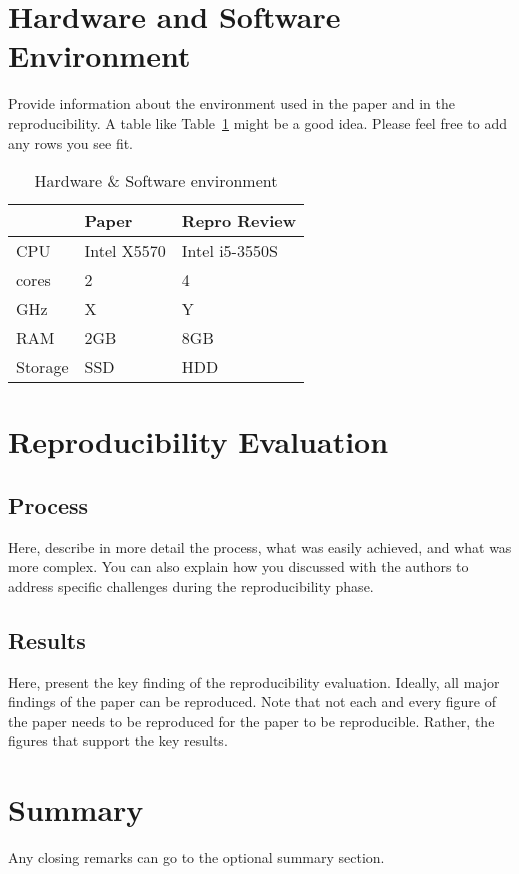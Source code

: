 \documentclass[sigconf]{acmart}
\begin{document}
\section{Hardware and Software Environment}
Provide information about the environment used in the paper and in the reproducibility. A table like Table~\ref{tab:environment} might be a good idea. Please feel free to add any rows you see fit.

\begin{table}[h]
  \caption{Hardware \& Software environment}
  \label{tab:environment}
  \begin{tabular}{lll}
    \toprule
     & Paper & Repro Review\\
    \midrule
    CPU & Intel X5570 & Intel i5-3550S\\
    cores & 2 & 4 \\
    GHz & X & Y \\
    RAM & 2GB & 8GB \\
    Storage & SSD & HDD \\
  \bottomrule
\end{tabular}
\end{table}


\section{Reproducibility Evaluation}

\subsection{Process}
Here, describe in more detail the process, what was easily achieved, and what was more complex. You can also explain how you discussed with the authors to address specific challenges during the reproducibility phase.

\subsection{Results}
Here, present the key finding of the reproducibility evaluation. Ideally, all major findings of the paper can be reproduced. Note that not each and every figure of the paper needs to be reproduced for the paper to be reproducible. Rather, the figures that support the key results. 

\section{Summary}
Any closing remarks can go to the optional summary section.




 
\end{document}
